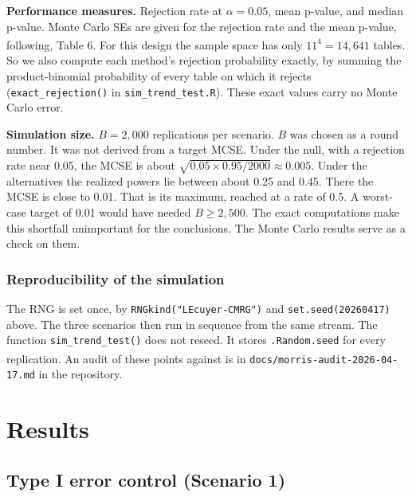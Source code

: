 \documentclass[
  11pt,
]{article}
\begin{document}
\textbf{Performance measures.} Rejection rate at
\(\alpha = 0.05\), mean p-value, and median p-value. Monte
Carlo SEs are given for the rejection rate and the mean
p-value, following\textsuperscript{}, Table 6. For this
design the sample space has only \(11^4 = 14{,}641\)
tables. So we also compute each method's rejection
probability exactly, by summing the product-binomial
probability of every table on which it rejects
(\texttt{exact\_rejection()} in \texttt{sim\_trend\_test.R}). These exact
values carry no Monte Carlo error.

\textbf{Simulation size.} \(B = 2{,}000\) replications per
scenario. \(B\) was chosen as a round number. It was not
derived from a target MCSE. Under the null, with a
rejection rate near 0.05, the MCSE is about
\(\sqrt{0.05 \times 0.95 / 2000} \approx 0.005\). Under the
alternatives the realized powers lie between about 0.25
and 0.45. There the MCSE is close to 0.01. That is its
maximum, reached at a rate of 0.5. A worst-case target of 0.01 would have needed
\(B \geq 2{,}500\). The exact computations make this
shortfall unimportant for the conclusions. The Monte
Carlo results serve as a check on them.

\subsubsection{Reproducibility of the simulation}\label{reproducibility-of-the-simulation}

The RNG is set once, by \texttt{RNGkind("L\textquotesingle{}Ecuyer-CMRG")} and
\texttt{set.seed(20260417)} above. The three scenarios then run
in sequence from the same stream. The function
\texttt{sim\_trend\_test()} does not reseed. It stores
\texttt{.Random.seed} for every replication. An audit of these
points against\textsuperscript{} is in
\texttt{docs/morris-audit-2026-04-17.md} in the repository.

\section{Results}\label{results}

\subsection{Type I error control (Scenario 1)}\label{type-i-error-control-scenario-1}
\end{document}
